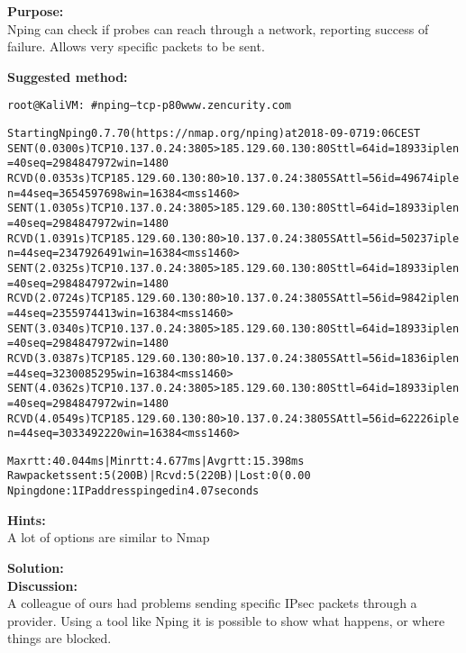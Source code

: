 \documentclass[a4paper,11pt,notitlepage]{report}
\begin{document}
{\bf Purpose:}\\
Nping can check if probes can reach through a network, reporting success of failure. Allows very specific packets to be sent.

{\bf Suggested method:}\\
\begin{alltt}\footnotesize
  root@KaliVM:~# nping --tcp -p 80 www.zencurity.com

  Starting Nping 0.7.70 ( https://nmap.org/nping ) at 2018-09-07 19:06 CEST
  SENT (0.0300s) TCP 10.137.0.24:3805 > 185.129.60.130:80 S ttl=64 id=18933 iplen=40  seq=2984847972 win=1480
  RCVD (0.0353s) TCP 185.129.60.130:80 > 10.137.0.24:3805 SA ttl=56 id=49674 iplen=44  seq=3654597698 win=16384 <mss 1460>
  SENT (1.0305s) TCP 10.137.0.24:3805 > 185.129.60.130:80 S ttl=64 id=18933 iplen=40  seq=2984847972 win=1480
  RCVD (1.0391s) TCP 185.129.60.130:80 > 10.137.0.24:3805 SA ttl=56 id=50237 iplen=44  seq=2347926491 win=16384 <mss 1460>
  SENT (2.0325s) TCP 10.137.0.24:3805 > 185.129.60.130:80 S ttl=64 id=18933 iplen=40  seq=2984847972 win=1480
  RCVD (2.0724s) TCP 185.129.60.130:80 > 10.137.0.24:3805 SA ttl=56 id=9842 iplen=44  seq=2355974413 win=16384 <mss 1460>
  SENT (3.0340s) TCP 10.137.0.24:3805 > 185.129.60.130:80 S ttl=64 id=18933 iplen=40  seq=2984847972 win=1480
  RCVD (3.0387s) TCP 185.129.60.130:80 > 10.137.0.24:3805 SA ttl=56 id=1836 iplen=44  seq=3230085295 win=16384 <mss 1460>
  SENT (4.0362s) TCP 10.137.0.24:3805 > 185.129.60.130:80 S ttl=64 id=18933 iplen=40  seq=2984847972 win=1480
  RCVD (4.0549s) TCP 185.129.60.130:80 > 10.137.0.24:3805 SA ttl=56 id=62226 iplen=44  seq=3033492220 win=16384 <mss 1460>

  Max rtt: 40.044ms | Min rtt: 4.677ms | Avg rtt: 15.398ms
  Raw packets sent: 5 (200B) | Rcvd: 5 (220B) | Lost: 0 (0.00%)
  Nping done: 1 IP address pinged in 4.07 seconds
\end{alltt}

{\bf Hints:} \\
A lot of options are similar to Nmap

{\bf Solution:}\\


{\bf Discussion:}\\
A colleague of ours had problems sending specific IPsec packets through a provider. Using a tool like Nping it is possible to show what happens, or where things are blocked.
\end{document}
